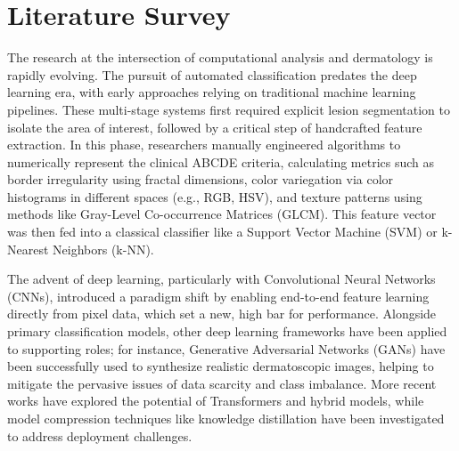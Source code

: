 \clearpage
\noindent 

\noindent
\section{Literature Survey}
The research at the intersection of computational analysis and dermatology is rapidly evolving. The pursuit of automated classification predates the deep learning era, with early approaches relying on traditional machine learning pipelines. These multi-stage systems first required explicit lesion segmentation to isolate the area of interest, followed by a critical step of handcrafted feature extraction. In this phase, researchers manually engineered algorithms to numerically represent the clinical ABCDE criteria, calculating metrics such as border irregularity using fractal dimensions, color variegation via color histograms in different spaces (e.g., RGB, HSV), and texture patterns using methods like Gray-Level Co-occurrence Matrices (GLCM). This feature vector was then fed into a classical classifier like a Support Vector Machine (SVM) or k-Nearest Neighbors (k-NN).

The advent of deep learning, particularly with Convolutional Neural Networks (CNNs), introduced a paradigm shift by enabling end-to-end feature learning directly from pixel data, which set a new, high bar for performance. Alongside primary classification models, other deep learning frameworks have been applied to supporting roles; for instance, Generative Adversarial Networks (GANs) have been successfully used to synthesize realistic dermatoscopic images, helping to mitigate the pervasive issues of data scarcity and class imbalance. More recent works have explored the potential of Transformers and hybrid models, while model compression techniques like knowledge distillation have been investigated to address deployment challenges.

